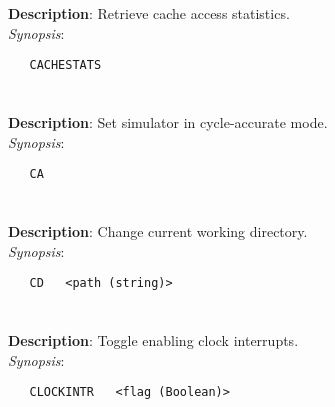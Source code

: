 \section{\quad{}}
\label{manpages:CACHESTATS}
\label{manpages:cachestats}
\vspace{-0.1in}
{\bf Description}: 	Retrieve cache access statistics.\\[1.5ex]
{\em Synopsis}:
\vspace{-0.05in}
\scriptsize
\begin{lstlisting}
   CACHESTATS   										
\end{lstlisting}
\normalsize
\vspace{-0.05in}


\section{\quad{}}
\label{manpages:CA}
\label{manpages:ca}
\vspace{-0.1in}
{\bf Description}: 	Set simulator in cycle-accurate mode.\\[1.5ex]
{\em Synopsis}:
\vspace{-0.05in}
\scriptsize
\begin{lstlisting}
   CA   									
\end{lstlisting}
\normalsize
\vspace{-0.05in}


\section{\quad{}}
\label{manpages:CD}
\label{manpages:cd}
\vspace{-0.1in}
{\bf Description}: 	Change current working directory.\\[1.5ex]
{\em Synopsis}:
\vspace{-0.05in}
\scriptsize
\begin{lstlisting}
   CD   <path (string)>																			
\end{lstlisting}
\normalsize
\vspace{-0.05in}


\section{\quad{}}
\label{manpages:CLOCKINTR}
\label{manpages:clockintr}
\vspace{-0.1in}
{\bf Description}: 	Toggle enabling clock interrupts.\\[1.5ex]
{\em Synopsis}:
\vspace{-0.05in}
\scriptsize
\begin{lstlisting}
   CLOCKINTR   <flag (Boolean)>								
\end{lstlisting}
\normalsize
\vspace{-0.05in}



